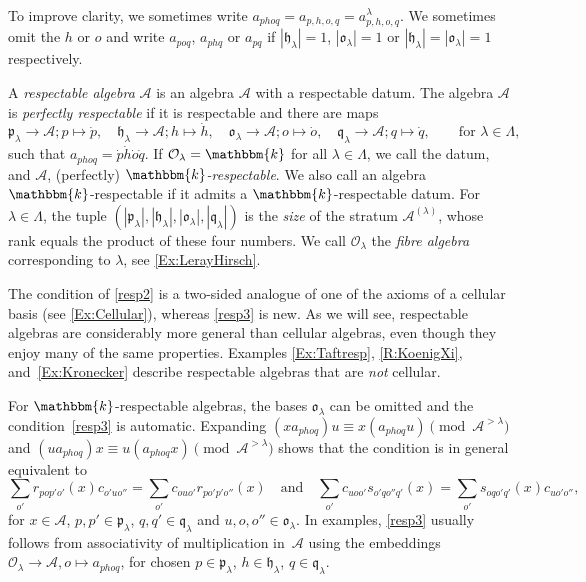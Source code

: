 \documentclass[a4paper,11pt]{amsart}
\numberwithin{equation}{subsection}
\theoremstyle{definition}
\theoremstyle{theorem}
\theoremstyle{remark}
\newcommand\CA{\mathcal{A}}
\newcommand\CO{\mathcal{O}}
\newcommand\plam[1][\lambda]{\mathfrak{p}_{#1}}
\newcommand\hlam[1][\lambda]{\mathfrak{h}_{#1}}
\newcommand\qlam[1][\lambda]{\mathfrak{q}_{#1}}
\newcommand\Olam[1][\lambda]{\CO_{#1}}
\newcommand\olam[1][\lambda]{\mathfrak{o}_{#1}}
\newcommand\kk{\mathbbm{k}}
\begin{document}
     To improve clarity, we sometimes write
  $a_{phoq}=a_{p,h,o,q}=a^\lambda_{p,h,o,q}$. We sometimes omit the $h$ or
  $o$ and write $a_{poq}$, $a_{phq}$ or $a_{pq}$ if
  $|\hlam|=1$, $|\olam|=1$ or $|\hlam|=|\olam|=1$ respectively.
           \begin{Definition}\label{perfectresp}
    A   \emph{respectable algebra} $\CA$ is an algebra $\CA$ with a respectable datum.
    The algebra $\CA$ is  \emph{perfectly respectable} if it is respectable and there are maps
    \[
      \plam\to \CA; p\mapsto\dot p,\quad
      \hlam\to \CA; h\mapsto\dot h,\quad
      \olam\to \CA; o\mapsto\dot o,\quad
      \qlam\to \CA; q\mapsto\dot q,
      \qquad\text{for }\lambda\in\Lambda,
    \]
    such that $a_{phoq}=\dot p\dot h \dot o \dot q$.
    If $\Olam=\kk$ for all $\lambda\in\Lambda$, we call the datum, and $\mathcal{A}$, (perfectly) \emph{$\kk$-respectable}. We also call an algebra $\kk$-respectable if it admits a $\kk$-respectable datum.
    For $\lambda\in\Lambda$, the tuple
    $(|\plam|,|\hlam|,|\olam|,|\qlam|)$ is the \emph{size} of the
    stratum $\CA^{(\lambda)}$, whose rank equals the product
    of these four numbers. We call $\Olam$ the \emph{fibre algebra} corresponding to $\lambda$, see \autoref{Ex:LerayHirsch}.
\end{Definition}

\begin{Remark}
   The condition of \autoref{resp2} is a two-sided analogue of one of
   the axioms of a cellular basis (see \autoref{Ex:Cellular}), whereas
   \autoref{resp3} is new. As we will see, respectable algebras are
   considerably more general than cellular algebras, even though they
   enjoy many of the same properties. Examples \ref{Ex:Taftresp},
   \ref{R:KoenigXi}, and~\ref{Ex:Kronecker}
   describe respectable algebras that are \textit{not} cellular.
 \end{Remark}

\begin{Remark}\label{R:associativity}
  For $\kk$-respectable algebras, the bases $\olam$ can be omitted and
  the condition~\autoref{resp3} is automatic. Expanding
  $(xa_{phoq})u\equiv x(a_{phoq}u)\pmod{\CA^{>\lambda}}$ and
  $(ua_{phoq})x\equiv u(a_{phoq}x)\pmod{\CA^{>\lambda}}$ shows
  that  the condition is in general equivalent to
  \[
    \sum_{o'}r_{pop'o'}(x)c_{o'uo''}=\sum_{o'}c_{ouo'}r_{po'p'o''}(x)
    \quad\text{and}\quad
    \sum_{o'}c_{uoo'}s_{o'qo''q'}(x)=\sum_{o'}s_{oqo'q'}(x)c_{uo'o''},
  \]
  for $x\in \CA$, $p,p'\in\plam$, $q,q'\in\qlam$ and
  $u,o,o''\in\olam$. In examples,  \autoref{resp3} usually follows from
  associativity of multiplication in~$\CA$ using the embeddings
  $\Olam\to \CA, o\mapsto a_{phoq}$, for chosen $p\in\plam$,
  $h\in\hlam$, $q\in\qlam$.
\end{Remark}
\end{document}
